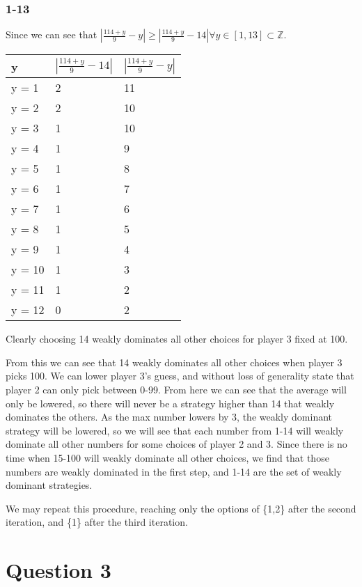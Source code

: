 \documentclass[10pt]{paper}
\begin{document}
\subsubsection*{1-13}
Since we can see that $\left | \frac{ 114+y}{9} - y \right| \geq \left |
  \frac{114+y}{9} - 14 \right | \forall y \in [1,13] \subset \mathbb{Z}$.

\begin{tabular*}{1.0\linewidth}{l|l|l}
y & $\left | \frac{114+y}{9} - 14 \right |$ & $ \left | \frac{114+y}{9}- y \right |$\\\hline
y = 1 & 2 & 11\\
y = 2 & 2 & 10\\
y = 3 & 1 & 10\\
y = 4 & 1 & 9\\
y = 5 & 1 & 8\\
y = 6 & 1 & 7\\
y = 7 & 1 & 6\\
y = 8 & 1 & 5\\
y = 9 & 1 & 4\\
y = 10 & 1 & 3\\
y = 11 & 1 & 2\\
y = 12 & 0 & 2\\
\end{tabular*}

Clearly choosing 14 weakly dominates all other choices for player 3
fixed at 100. 

From this we can see that 14 weakly dominates all other choices when
player 3 picks 100. We can lower player 3's guess, and without loss of
generality state that player 2 can only pick between 0-99. From here
we can see that the average will only be lowered, so there will never
be a strategy higher than 14 that weakly dominates the
others. As the max number lowers by 3, the weakly dominant strategy
will be lowered, so we will see that each number from 1-14 will weakly
dominate all other numbers for some choices of player 2 and 3. Since
there is no time when 15-100 will weakly dominate all other choices,
we find that those numbers are weakly dominated in the first step, and
1-14 are the set of weakly dominant strategies.

We may repeat this procedure, reaching only the options of \{1,2\}
after the second iteration, and \{1\} after the third iteration.

\section*{Question 3 }
\end{document}
